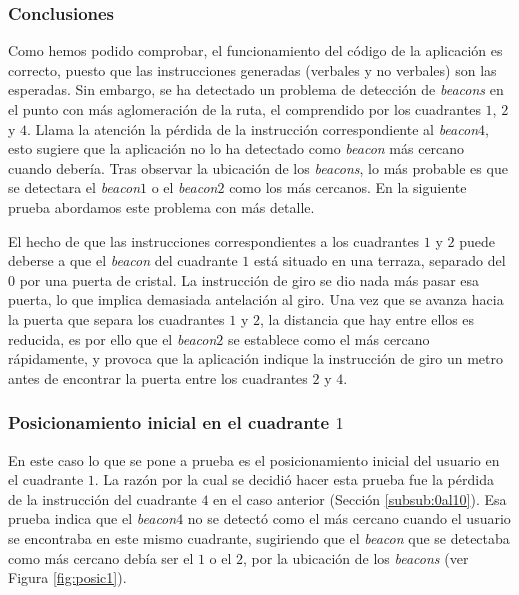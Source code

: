 \subsubsection*{Conclusiones}

Como hemos podido comprobar, el funcionamiento del código de la aplicación es correcto, puesto que las instrucciones generadas (verbales y no verbales) son las esperadas. Sin embargo, se ha detectado un problema de detección de \textit{beacons} en el punto con más aglomeración de la ruta, el comprendido por los cuadrantes $1$, $2$ y $4$. Llama la atención la pérdida de la instrucción correspondiente al \textit{beacon$4$}, esto sugiere que la aplicación no lo ha detectado como \textit{beacon} más cercano cuando debería. Tras observar la ubicación de los \textit{beacons}, lo más probable es que se detectara el \textit{beacon$1$} o el \textit{beacon$2$} como los más cercanos. En la siguiente prueba abordamos este problema con más detalle. 

El hecho de que las instrucciones correspondientes a los cuadrantes $1$ y $2$ puede deberse a que el \textit{beacon} del cuadrante $1$ está situado en una terraza, separado del $0$ por una puerta de cristal. La instrucción de giro se dio nada más pasar esa puerta, lo que implica demasiada antelación al giro. Una vez que se avanza hacia la puerta que separa los cuadrantes $1$ y $2$, la distancia que hay entre ellos es reducida, es por ello que el \textit{beacon$2$} se establece como el más cercano rápidamente, y provoca que la aplicación indique la instrucción de giro un metro antes de encontrar la puerta entre los cuadrantes $2$ y $4$.


\subsubsection{Posicionamiento inicial en el cuadrante $1$}
\label{subsub:pos1}

En este caso lo que se pone a prueba es el posicionamiento inicial del usuario en el cuadrante $1$. La razón por la cual se decidió hacer esta prueba fue la pérdida de la instrucción del cuadrante $4$ en el caso anterior (Sección \ref{subsub:0al10}). Esa prueba indica que el \textit{beacon$4$} no se detectó como el más cercano cuando el usuario se encontraba en este mismo cuadrante, sugiriendo que el \textit{beacon} que se detectaba como más cercano debía ser el $1$ o el $2$, por la ubicación de los \textit{beacons} (ver Figura \ref{fig:posic1}).


